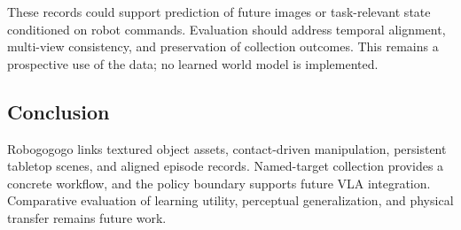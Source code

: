 \documentclass[10pt]{article}
\begin{document}
These records could support prediction of future images or task-relevant state conditioned on robot commands. Evaluation should address temporal alignment, multi-view consistency, and preservation of collection outcomes. This remains a prospective use of the data; no learned world model is implemented.

\begin{samepage}
\section{Conclusion}
Robogogogo links textured object assets, contact-driven manipulation, persistent tabletop scenes, and aligned episode records. Named-target collection provides a concrete workflow, and the policy boundary supports future VLA integration. Comparative evaluation of learning utility, perceptual generalization, and physical transfer remains future work.

\end{samepage}



\end{document}

